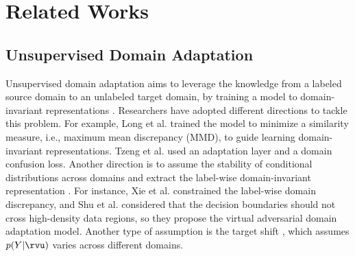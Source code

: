 \section{Related Works}
\label{related_works}




\subsection{Unsupervised Domain Adaptation}
Unsupervised domain adaptation \cite{cai2019learning,kong2022partial,shui2021aggregating,stojanov2021domain,wen2019bayesian,zhang2013domain} aims to leverage the knowledge from a labeled source domain to an unlabeled target domain, by training a model to domain-invariant representations \cite{bousmalis2016domain}. Researchers have adopted different directions to tackle this problem. For example, Long et al. \cite{long2017deep} trained the model to minimize a similarity measure, i.e., maximum mean discrepancy (MMD), to guide learning domain-invariant representations. Tzeng et al. \cite{tzeng2014deep} used an adaptation layer and a domain confusion loss. Another direction is to assume the stability of conditional distributions across domains and extract the label-wise domain-invariant representation \cite{chen2019joint,chen2019progressive,kang2020contrastive}. For instance, Xie et al. \cite{xie2018learning} constrained the label-wise domain discrepancy, and Shu et al. \cite{shu2018dirt} considered that the decision boundaries should not cross high-density data regions, so they propose the virtual adversarial domain adaptation model. Another type of assumption is the target shift \cite{lipton2018detecting,roberts2022unsupervised,wen2020domain,zhang2013domain}, which assumes $p(Y|\rvu)$ varies across different domains. 

